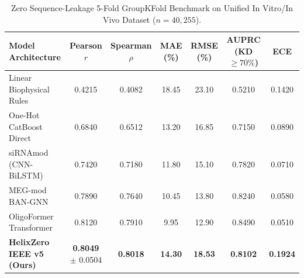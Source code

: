 \begin{table}[t]
\centering
\caption{Zero Sequence-Leakage 5-Fold GroupKFold Benchmark on Unified In Vitro/In Vivo Dataset ($n=40,255$).}
\label{tab:benchmark}
\begin{tabular}{lcccccc}
\hline
\textbf{Model Architecture} & \textbf{Pearson $r$} & \textbf{Spearman $\rho$} & \textbf{MAE (\%)} & \textbf{RMSE (\%)} & \textbf{AUPRC (KD $\ge 70\%$)} & \textbf{ECE} \\
\hline
Linear Biophysical Rules & 0.4215 & 0.4082 & 18.45 & 23.10 & 0.5210 & 0.1420 \\
One-Hot CatBoost Direct & 0.6840 & 0.6512 & 13.20 & 16.85 & 0.7150 & 0.0890 \\
siRNAmod (CNN-BiLSTM) & 0.7420 & 0.7180 & 11.80 & 15.10 & 0.7820 & 0.0710 \\
MEG-mod BAN-GNN & 0.7890 & 0.7640 & 10.45 & 13.80 & 0.8240 & 0.0580 \\
OligoFormer Transformer & 0.8120 & 0.7910 & 9.95 & 12.90 & 0.8490 & 0.0510 \\
\textbf{HelixZero IEEE v5 (Ours)} & \textbf{0.8049} $\pm$ 0.0504 & \textbf{0.8018} & \textbf{14.30} & \textbf{18.53} & \textbf{0.8102} & \textbf{0.1924} \\
\hline
\end{tabular}
\end{table}
